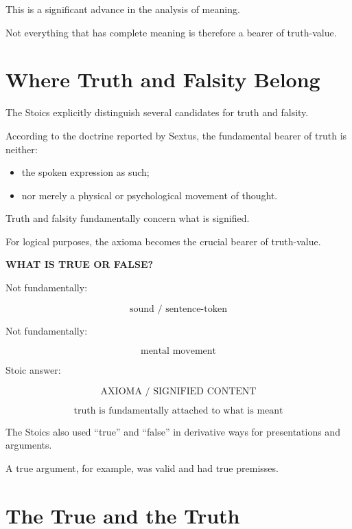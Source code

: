 \documentclass[11pt]{article}
\begin{document}
This is a significant advance in the analysis of meaning.

Not everything that has complete meaning is therefore a bearer of
truth-value.

\section{Where Truth and Falsity Belong}

The Stoics explicitly distinguish several candidates for truth and
falsity.

According to the doctrine reported by Sextus, the fundamental
bearer of truth is neither:

\begin{itemize}
    \item the spoken expression as such;
    \item nor merely a physical or psychological movement of
    thought.
\end{itemize}

Truth and falsity fundamentally concern what is signified.

For logical purposes, the axioma becomes the crucial bearer of
truth-value.

\begin{whiteboard}
\textbf{WHAT IS TRUE OR FALSE?}

Not fundamentally:

\[
\text{sound / sentence-token}
\]

Not fundamentally:

\[
\text{mental movement}
\]

Stoic answer:

\[
\boxed{
\text{AXIOMA / SIGNIFIED CONTENT}
}
\]

\[
\text{truth is fundamentally attached to what is meant}
\]
\end{whiteboard}

The Stoics also used ``true'' and ``false'' in derivative ways for
presentations and arguments.

A true argument, for example, was valid and had true premisses.

\section{The True and the Truth}
\end{document}
